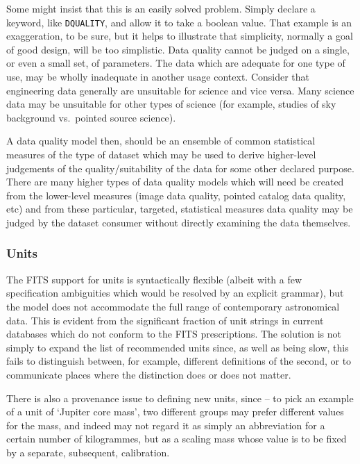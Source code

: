 \documentclass[final,authoryear,5p,times,twocolumn]{elsarticle}
\begin{document}
{{Some might insist that this is an easily solved problem. Simply
declare a keyword, like \texttt{DQUALITY}, and allow it to take a boolean
value. That example is an exaggeration, to be sure, but it helps to
illustrate that simplicity, normally a goal of good design, will be
too simplistic. Data quality cannot be judged on a single, or even a 
small set, of parameters. The
data which are adequate for one type of use, may be wholly inadequate
in another usage context. Consider that engineering data generally are
unsuitable for science and vice versa. Many science data may be
unsuitable for other types of science (for example, studies of sky
background vs.\ pointed source science).


A data quality model then, should be an ensemble of common statistical
measures of the type of dataset which may be used to derive
higher-level judgements of the quality/suitability of the data for
some other declared purpose. There are many higher types of data
quality models which will need be created from the lower-level
measures (image data quality, pointed catalog data quality, etc) and
from these particular, targeted, statistical measures data quality may
be judged by the dataset consumer without directly examining the data
themselves.


\subsubsection{Units}


The FITS support for units is syntactically flexible (albeit with
a few specification ambiguities which would be resolved by an explicit
grammar), but the model does not accommodate the full range of
contemporary astronomical data.  This is evident from the significant
fraction of unit strings in current databases which do not conform to
the FITS prescriptions.  The solution is not simply to expand the list
of recommended units since, as well as being slow, this fails to
distinguish between, for example, different definitions of the second,
or to communicate places where the distinction does or does not
matter.

There is also a provenance issue to defining new units, since -- to
pick an example of a unit of `Jupiter core mass', two different
groups may prefer different values for the mass, and indeed may not
regard it as simply an abbreviation for a certain number of
kilogrammes, but as a scaling mass whose value is to be fixed by a
separate, subsequent, calibration.

}}
\end{document}
